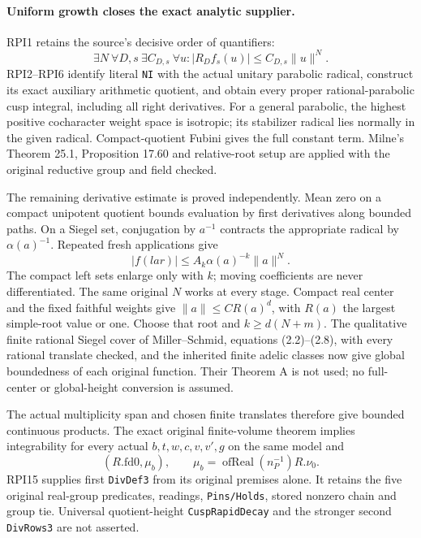 \paragraph{Uniform growth closes the exact analytic supplier.}
RPI1 retains the source's decisive order of quantifiers:
\[
 \exists N\ \forall D,s\ \exists C_{D,s}\ \forall u:
           |R_Df_s(u)|\le C_{D,s}\|u\|^N.
\]
RPI2--RPI6 identify literal \texttt{NI} with the actual
unitary parabolic radical, construct its exact auxiliary
arithmetic quotient, and obtain every proper rational-parabolic
cusp integral, including all right derivatives. For a general
parabolic, the highest positive cocharacter weight space is
isotropic; its stabilizer radical lies normally in the given
radical. Compact-quotient Fubini gives the full constant term.
Milne's Theorem 25.1, Proposition 17.60 and relative-root setup
are applied with the original reductive group and field checked.

The remaining derivative estimate is proved independently.
Mean zero on a compact unipotent quotient bounds evaluation by
first derivatives along bounded paths. On a Siegel set,
conjugation by $a^{-1}$ contracts the appropriate radical by
$\alpha(a)^{-1}$. Repeated fresh applications give
\[
 |f(lar)|\le A_k\alpha(a)^{-k}\|a\|^N.
\]
The compact left sets enlarge only with $k$; moving coefficients
are never differentiated. The same original $N$ works at every
stage. Compact real center and the fixed faithful weights give
$\|a\|\le C R(a)^d$, with $R(a)$ the largest simple-root value
or one. Choose that root and $k\ge d(N+m)$. The qualitative
finite rational Siegel cover of Miller--Schmid, equations
(2.2)--(2.8), with every rational translate checked, and the
inherited finite adelic classes now give global boundedness
of each original function. Their Theorem A is not used;
no full-center or global-height conversion is assumed.

The actual multiplicity span and chosen finite translates
therefore give bounded continuous products. The exact original
finite-volume theorem implies integrability for every actual
$b,t,w,c,v,v',g$ on the same model and
\[
 (R.\mathrm{fd0},\mu_b),\qquad
 \mu_b=\operatorname{ofReal}(n_P^{-1})R.\nu_0.
\]
RPI15 supplies first \texttt{DivDef3} from its original premises
alone. It retains the five original real-group predicates,
readings, \texttt{Pins/Holds}, stored nonzero chain and group
tie. Universal quotient-height \texttt{CuspRapidDecay} and the
stronger second \texttt{DivRows3} are not asserted.

